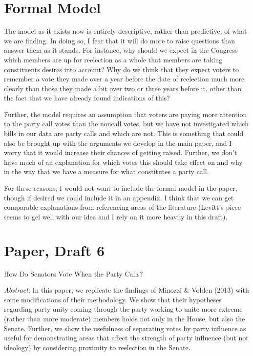 \documentclass[12pt]{article}
\begin{document}
\section{Formal Model}

The model as it exists now is entirely descriptive, rather than predictive, of what we are finding. In doing so, I fear that it will do more to raise questions than answer them as it stands. For instance, why should we expect in the Congress which members are up for reelection as a whole that members are taking constituents desires into account? Why do we think that they expect voters to remember a vote they made over a year before the date of reelection much more clearly than those they made a bit over two or three years before it, other than the fact that we have already found indications of this? 

Further, the model requires an assumption that voters are paying more attention to the party call votes than the noncall votes, but we have not investigated which bills in our data are party calls and which are not. This is something that could also be brought up with the arguments we develop in the main paper, and I worry that it would increase their chances of getting raised. Further, we don't have much of an explanation for which votes this should take effect on and why in the way that we have a measure for what constitutes a party call.

For these reasons, I would not want to include the formal model in the paper, though if desired we could include it in an appendix. I think that we can get comparable explanations from referencing areas of the literature (Levitt's piece seems to gel well with our idea and I rely on it more heavily in this draft).

\pagebreak

\doublespacing
	
\section{Paper, Draft 6}

\begin{center}
	\large How Do Senators Vote When the Party Calls?
\end{center}

\begin{minipage}{15cm}
	\singlespacing
	\small \textit{Abstract}: In this paper, we replicate the findings of Minozzi \& Volden (2013) with some modifications of their methodology. We show that their hypotheses regarding party unity coming through the party working to unite more extreme (rather than more moderate) members holds not only in the House, but also the Senate. Further, we show the usefulness of separating votes by party influence as useful for demonstrating areas that affect the strength of party influence (but not ideology) by considering proximity to reelection in the Senate.
\end{minipage}
\end{document}
